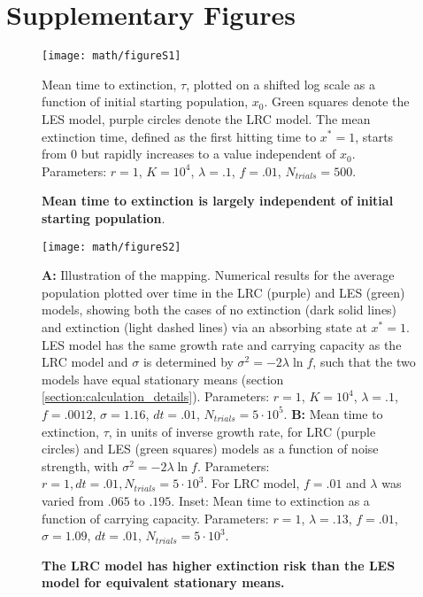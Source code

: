 \section{Supplementary Figures}
\renewcommand\thefigure{\arabic{chapter}.S\arabic{figure}}   
\setcounter{figure}{0}    
\begin{figure}[h]
\centerline{
	\texttt{[image: math/figureS1]}}
	\caption{\textbf{Mean time to extinction is largely independent of initial starting population}.}  {Mean time to extinction, $\tau$, plotted on a shifted log scale as a function of initial starting population, $x_0$.  Green squares denote the LES model, purple circles denote the LRC model.  The mean extinction time, defined as the first hitting time to $x^* = 1$, starts from 0 but rapidly increases to a value independent of $x_0$.  Parameters:  $r = 1$, $K = 10^4$, $\lambda = .1$, $f = .01$, $N_{trials} = 500$.}
\end{figure}

\begin{figure}[h]
\centerline{
	\texttt{[image: math/figureS2]}}
	\caption{\textbf{The LRC model has higher extinction risk than the LES model for equivalent stationary means.}} {\textbf{A:} Illustration of the mapping.  Numerical results for the average population plotted over time in the LRC (purple) and LES (green) models, showing both the cases of no extinction (dark solid lines) and extinction (light dashed lines) via an absorbing state at $x^* = 1$.  LES model has the same growth rate and carrying capacity as the LRC model and $\sigma$ is determined by $\sigma^2 = -2\lambda\ln f$, such that the two models have equal stationary means (section \ref{section:calculation_details}).  Parameters:  $r = 1$, $K = 10^4$, $\lambda = .1$, $f = .0012$, $\sigma = 1.16$, $dt = .01$, $N_{trials} = 5\cdot 10^5$.  \textbf{B:}  Mean time to extinction, $\tau$, in units of inverse growth rate, for LRC (purple circles) and LES (green squares) models as a function of noise strength, with $\sigma^2 = -2\lambda\ln f$.   Parameters:  $r = 1, dt = .01, N_{trials} = 5\cdot 10^3$.  For LRC model, $f = .01$ and $\lambda$ was varied from $.065$ to $.195$.  Inset:  Mean time to extinction as a function of carrying capacity.  Parameters:  $r = 1$,  $\lambda = .13$, $f = .01$, $\sigma = 1.09$, $dt = .01$, $N_{trials} = 5\cdot 10^3$.}
\end{figure}

\renewcommand\thefigure{\arabic{chapter}.\arabic{figure}}  


